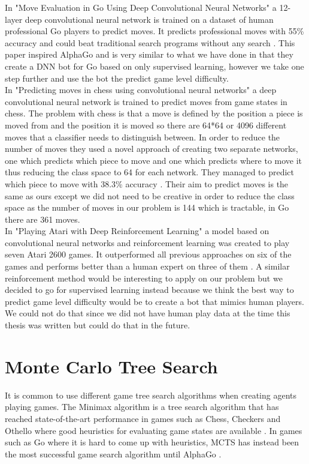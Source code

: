 \documentclass{kththesis}
\begin{document}
In "Move Evaluation in Go Using Deep Convolutional Neural Networks" a 12-layer deep convolutional neural network  is trained on a dataset of human professional Go players  to predict moves. It predicts professional moves with 55\% accuracy  and could beat traditional search programs without any search \cite{goMoveEvaluation2014}. This paper inspired AlphaGo and is very similar to what we have done in that they create a DNN bot for Go based on only supervised learning, however we take one step further and use the bot the predict game level difficulty.\\

In "Predicting moves in chess using convolutional neural networks" a deep convolutional neural network is trained to predict moves from game states in chess. The problem with chess is that a move is defined by the position a piece is moved from and the position it is moved so there are 64*64 or 4096 different moves that a classifier needs to distinguish between. In order to reduce the number of moves they used a novel approach of creating two separate networks, one which predicts which piece to move and one which predicts where to move it thus reducing the class space to 64 for each network. They managed to predict which piece to move with 38.3\% accuracy \cite{oshripredicting}. Their aim to predict moves is the same as ours except we did not need to be creative in order to reduce the class space as the number of moves in our problem is 144 which is tractable, in Go there are 361 moves. \\

In "Playing Atari with Deep Reinforcement Learning" a  model based on convolutional neural networks and reinforcement learning was created to play seven Atari 2600 games. It outperformed all previous approaches on six of the games  and  performs better than a human expert on three of them \cite{mnih2013playing}. A similar reinforcement method would be interesting to apply on our problem but we decided to go for supervised learning instead because we think the best way to predict game level difficulty would be to create a bot that mimics human players. We could not do that since we did not have human play data at the time this thesis was written but could do that in the future. \\

\section{Monte Carlo Tree Search}
It is common to use different game tree search algorithms when creating agents playing games. The Minimax algorithm is a tree search algorithm that has reached state-of-the-art performance in games such as Chess, Checkers and Othello where good heuristics for evaluating game states are available \cite{alphaGo2016}. In games such as Go where it is hard to come up with heuristics, MCTS has instead been the most successful game search algorithm until AlphaGo \cite{goMoveEvaluation2014}.
\end{document}

